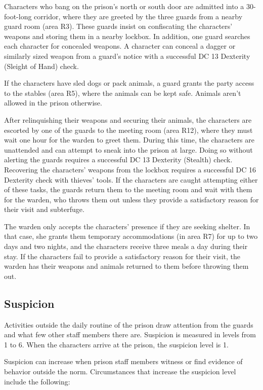 \documentclass[10pt,a4paper,twoside,bg=print,twocolumn,openany,nodeprecatedcode]{dndbook}
\begin{document}
Characters who bang on the prison's north or south door are admitted into a 30-foot-long corridor, where they are greeted by the three guards from a nearby guard room (area R3). These guards insist on confiscating the characters' weapons and storing them in a nearby lockbox. In addition, one guard searches each character for concealed weapons. A character can conceal a dagger or similarly sized weapon from a guard's notice with a successful DC 13 Dexterity (Sleight of Hand) check.

If the characters have sled dogs or pack animals, a guard grants the party access to the stables (area R5), where the animals can be kept safe. Animals aren't allowed in the prison otherwise.

After relinquishing their weapons and securing their animals, the characters are escorted by one of the guards to the meeting room (area R12), where they must wait one hour for the warden to greet them. During this time, the characters are unattended and can attempt to sneak into the prison at large. Doing so without alerting the guards requires a successful DC 13 Dexterity (Stealth) check. Recovering the characters' weapons from the lockbox requires a successful DC 16 Dexterity check with thieves' tools. If the characters are caught attempting either of these tasks, the guards return them to the meeting room and wait with them for the warden, who throws them out unless they provide a satisfactory reason for their visit and subterfuge.

The warden only accepts the characters' presence if they are seeking shelter. In that case, she grants them temporary accommodations (in area R7) for up to two days and two nights, and the characters receive three meals a day during their stay. If the characters fail to provide a satisfactory reason for their visit, the warden has their weapons and animals returned to them before throwing them out.

\subsection{Suspicion}
Activities outside the daily routine of the prison draw attention from the guards and what few other staff members there are. Suspicion is measured in levels from 1 to 6. When the characters arrive at the prison, the suspicion level is 1.

Suspicion can increase when prison staff members witness or find evidence of behavior outside the norm. Circumstances that increase the suspicion level include the following:
\end{document}
